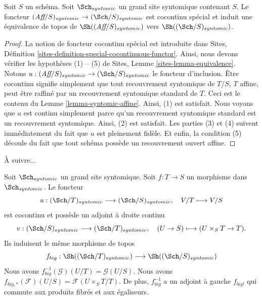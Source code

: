 \begin{lemma}
\label{lemma-affine-big-site-syntomic}
Soit $S$ un schéma. Soit $\Sch_{syntomic}$ un grand site syntomique contenant $S$. Le foncteur $(\textit{Aff}/S)_{syntomic} \to (\Sch/S)_{syntomic}$ est cocontinu spécial et induit une équivalence de topos de $\Sh((\textit{Aff}/S)_{syntomic})$ vers $\Sh((\Sch/S)_{syntomic})$.
\end{lemma}

\begin{proof}
La notion de foncteur cocontinu spécial est introduite dans Sites, Définition \ref{sites-definition-special-cocontinuous-functor}. Ainsi, nous devons vérifier les hypothèses (1) -- (5) de Sites, Lemme \ref{sites-lemma-equivalence}. Notons $u : (\textit{Aff}/S)_{syntomic} \to (\Sch/S)_{syntomic}$ le foncteur d'inclusion. Être cocontinu signifie simplement que tout recouvrement syntomique de $T/S$, $T$ affine, peut être raffiné par un recouvrement syntomique standard de $T$. Ceci est le contenu du Lemme \ref{lemma-syntomic-affine}. Ainsi, (1) est satisfait. Nous voyons que $u$ est continu simplement parce qu'un recouvrement syntomique standard est un recouvrement syntomique. Ainsi, (2) est satisfait. Les parties (3) et (4) suivent immédiatement du fait que $u$ est pleinement fidèle. Et enfin, la condition (5) découle du fait que tout schéma possède un recouvrement ouvert affine.
\end{proof}

\noindent
À suivre...

\begin{lemma}
\label{lemma-morphism-big-syntomic}
Soit $\Sch_{syntomic}$ un grand site syntomique. Soit $f : T \to S$ un morphisme dans $\Sch_{syntomic}$. Le foncteur
$$
u : (\Sch/T)_{syntomic} \longrightarrow (\Sch/S)_{syntomic},
\quad
V/T \longmapsto V/S
$$
est cocontinu et possède un adjoint à droite continu
$$
v : (\Sch/S)_{syntomic} \longrightarrow (\Sch/T)_{syntomic},
\quad
(U \to S) \longmapsto (U \times_S T \to T).
$$
Ils induisent le même morphisme de topos
$$
f_{big} :
\Sh((\Sch/T)_{syntomic})
\longrightarrow
\Sh((\Sch/S)_{syntomic})
$$
Nous avons $f_{big}^{-1}(\mathcal{G})(U/T) = \mathcal{G}(U/S)$. Nous avons $f_{big, *}(\mathcal{F})(U/S) = \mathcal{F}(U \times_S T/T)$. De plus, $f_{big}^{-1}$ a un adjoint à gauche $f_{big!}$ qui commute aux produits fibrés et aux égaliseurs.
\end{lemma}

